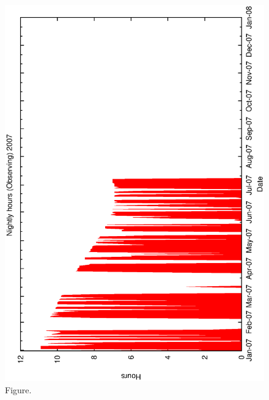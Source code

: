 \documentclass[12pt,a4paper]{article}
\begin{document}
\begin{figure}[htbp]
 \begin{center}
  \includegraphics[scale=1.0, angle=0]{figures/met_nightly_stats_obs2007.eps}
 \end{center}
  \caption[Figure.]
{Figure.}
\end{figure}
\clearpage
\end{document}
